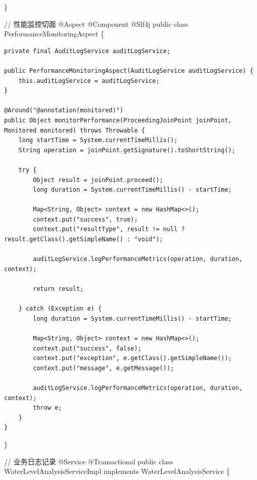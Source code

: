\}

// 性能监控切面 @Aspect @Component @Slf4j public class PerformanceMonitoringAspect \{

\begin{verbatim}
private final AuditLogService auditLogService;

public PerformanceMonitoringAspect(AuditLogService auditLogService) {
    this.auditLogService = auditLogService;
}

@Around("@annotation(monitored)")
public Object monitorPerformance(ProceedingJoinPoint joinPoint, Monitored monitored) throws Throwable {
    long startTime = System.currentTimeMillis();
    String operation = joinPoint.getSignature().toShortString();
    
    try {
        Object result = joinPoint.proceed();
        long duration = System.currentTimeMillis() - startTime;
        
        Map<String, Object> context = new HashMap<>();
        context.put("success", true);
        context.put("resultType", result != null ? result.getClass().getSimpleName() : "void");
        
        auditLogService.logPerformanceMetrics(operation, duration, context);
        
        return result;
        
    } catch (Exception e) {
        long duration = System.currentTimeMillis() - startTime;
        
        Map<String, Object> context = new HashMap<>();
        context.put("success", false);
        context.put("exception", e.getClass().getSimpleName());
        context.put("message", e.getMessage());
        
        auditLogService.logPerformanceMetrics(operation, duration, context);
        throw e;
    }
}
\end{verbatim}

\}

// 业务日志记录 @Service @Transactional public class WaterLevelAnalysisServiceImpl implements WaterLevelAnalysisService \{

